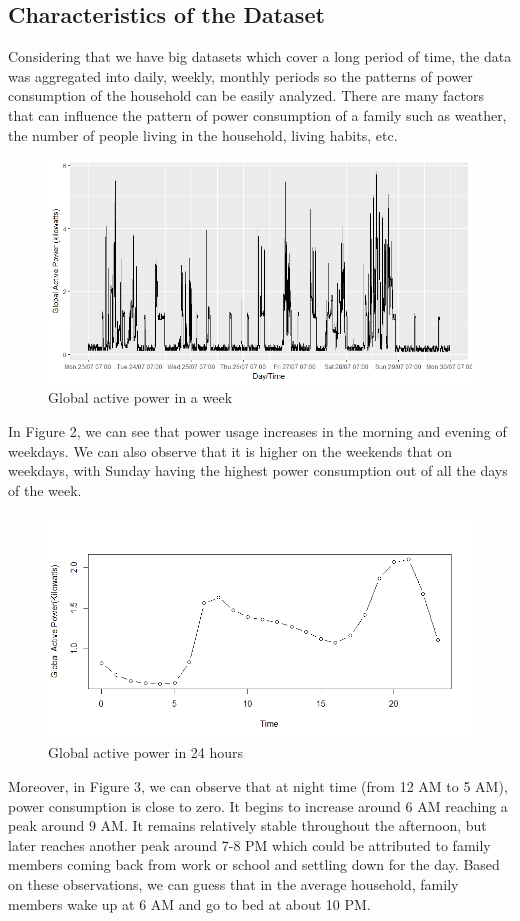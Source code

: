 \documentclass[letterpaper, 11pt]{article}%
\begin{document}
\subsection{Characteristics of the Dataset}
Considering that we have big datasets which cover a long period of time, the data was aggregated into daily, weekly, monthly periods so the patterns of power consumption of the household can be easily analyzed. There are many factors that can influence the pattern of power consumption of a family such as weather, the number of people living in the household, living habits, etc.
\begin{figure}[H]
  \centering
  \includegraphics[scale=0.5]{fig1}
  \caption{Global active power in a week}
\end{figure}
In Figure 2, we can see that power usage increases in the morning and evening of weekdays. We can also observe that it is higher on the weekends that on weekdays, with Sunday having the highest power consumption out of all the days of the week.
\begin{figure}[H]
  \centering
  \includegraphics[scale=0.4]{fig2}
  \caption{Global active power in 24 hours}
\end{figure}
Moreover, in Figure 3, we can observe that at night time (from 12 AM to 5 AM), power consumption is close to zero. It begins to increase around 6 AM reaching a peak around 9 AM. It remains relatively stable throughout the afternoon, but later reaches another peak around 7-8 PM which could be attributed to family members coming back from work or school and settling down for the day. Based on these observations, we can guess that in the average household, family members wake up at 6 AM and go to bed at about 10 PM.
\end{document}
